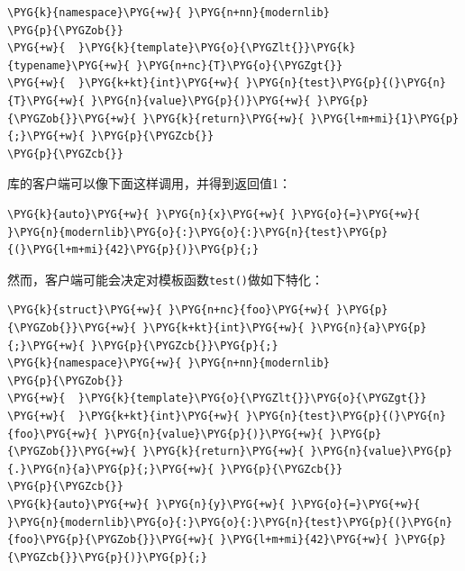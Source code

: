 
\begin{codeblockbg}
\begin{Verbatim}[commandchars=\\\{\},breaklines=true,breakanywhere=true,fontsize=\codefont,xleftmargin=17bp]
\PYG{k}{namespace}\PYG{+w}{ }\PYG{n+nn}{modernlib}
\PYG{p}{\PYGZob{}}
\PYG{+w}{  }\PYG{k}{template}\PYG{o}{\PYGZlt{}}\PYG{k}{typename}\PYG{+w}{ }\PYG{n+nc}{T}\PYG{o}{\PYGZgt{}}
\PYG{+w}{  }\PYG{k+kt}{int}\PYG{+w}{ }\PYG{n}{test}\PYG{p}{(}\PYG{n}{T}\PYG{+w}{ }\PYG{n}{value}\PYG{p}{)}\PYG{+w}{ }\PYG{p}{\PYGZob{}}\PYG{+w}{ }\PYG{k}{return}\PYG{+w}{ }\PYG{l+m+mi}{1}\PYG{p}{;}\PYG{+w}{ }\PYG{p}{\PYGZcb{}}
\PYG{p}{\PYGZcb{}}
\end{Verbatim}
\end{codeblockbg}



库的客户端可以像下面这样调用，并得到返回值1：



\begin{codeblockbg}
\begin{Verbatim}[commandchars=\\\{\},breaklines=true,breakanywhere=true,fontsize=\codefont,xleftmargin=17bp]
\PYG{k}{auto}\PYG{+w}{ }\PYG{n}{x}\PYG{+w}{ }\PYG{o}{=}\PYG{+w}{ }\PYG{n}{modernlib}\PYG{o}{:}\PYG{o}{:}\PYG{n}{test}\PYG{p}{(}\PYG{l+m+mi}{42}\PYG{p}{)}\PYG{p}{;}
\end{Verbatim}
\end{codeblockbg}



然而，客户端可能会决定对模板函数\texttt{test()}做如下特化：



\begin{codeblockbg}
\begin{Verbatim}[commandchars=\\\{\},breaklines=true,breakanywhere=true,fontsize=\codefont,xleftmargin=17bp]
\PYG{k}{struct}\PYG{+w}{ }\PYG{n+nc}{foo}\PYG{+w}{ }\PYG{p}{\PYGZob{}}\PYG{+w}{ }\PYG{k+kt}{int}\PYG{+w}{ }\PYG{n}{a}\PYG{p}{;}\PYG{+w}{ }\PYG{p}{\PYGZcb{}}\PYG{p}{;}
\PYG{k}{namespace}\PYG{+w}{ }\PYG{n+nn}{modernlib}
\PYG{p}{\PYGZob{}}
\PYG{+w}{  }\PYG{k}{template}\PYG{o}{\PYGZlt{}}\PYG{o}{\PYGZgt{}}
\PYG{+w}{  }\PYG{k+kt}{int}\PYG{+w}{ }\PYG{n}{test}\PYG{p}{(}\PYG{n}{foo}\PYG{+w}{ }\PYG{n}{value}\PYG{p}{)}\PYG{+w}{ }\PYG{p}{\PYGZob{}}\PYG{+w}{ }\PYG{k}{return}\PYG{+w}{ }\PYG{n}{value}\PYG{p}{.}\PYG{n}{a}\PYG{p}{;}\PYG{+w}{ }\PYG{p}{\PYGZcb{}}
\PYG{p}{\PYGZcb{}}
\PYG{k}{auto}\PYG{+w}{ }\PYG{n}{y}\PYG{+w}{ }\PYG{o}{=}\PYG{+w}{ }\PYG{n}{modernlib}\PYG{o}{:}\PYG{o}{:}\PYG{n}{test}\PYG{p}{(}\PYG{n}{foo}\PYG{p}{\PYGZob{}}\PYG{+w}{ }\PYG{l+m+mi}{42}\PYG{+w}{ }\PYG{p}{\PYGZcb{}}\PYG{p}{)}\PYG{p}{;}
\end{Verbatim}
\end{codeblockbg}


